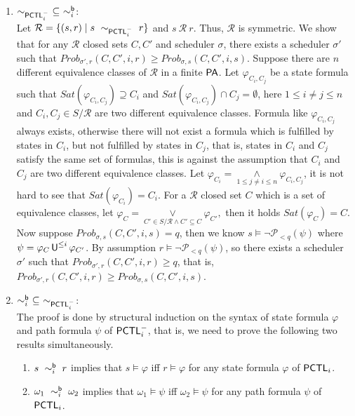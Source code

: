 \documentclass{LMCS}
\def\phi{\varphi}
\DeclareMathOperator{\U}{\text{\sf U}}
\newcommand{\PA}{{\sf PA}}
\newcommand{\PCTL}{{\sf PCTL}}
\newcommand{\iBSB}[1]{\sim_{#1}^{{\sf b}}}
\newcommand{\iEPCTLM}[1]{\sim_{\PCTL^{-}_{#1}}}
\newcommand{\MC}[1]{\mathcal{#1}}
\newcommand{\MEASURE}{\mathit{Prob}}
\begin{document}
\proof\hfill
\begin{enumerate}[(1)]
\item $\iEPCTLM{i}~\subseteq~\iBSB{i}$:\\
Let $\MC{R}=\{(s,r)\mid s~\iEPCTLM{i}~r\}$ and
  $s~\MC{R}~r$. Thus, $\MC{R}$ is symmetric. We show that for any
  $\MC{R}$ closed sets $C,C'$ and scheduler $\sigma$, there exists a
  scheduler $\sigma'$ such that
  $\MEASURE_{\sigma',r}(C,C',i,r)\geq\MEASURE_{\sigma,s}(C,C',i,s)$.
  Suppose there are $n$ different equivalence classes of $\MC{R}$ 
  in a finite $\PA$. Let
  $\phi_{C_i,C_j}$ be a state formula such that
  $\mathit{Sat}(\phi_{C_i,C_j})\supseteq C_i$ and
  $\mathit{Sat}(\phi_{C_i,C_j})\cap C_j=\emptyset$, here $1\leq i\neq
  j\leq n$ and $C_i,C_j\in S/\MC{R}$ are two different equivalence
  classes. Formula like $\phi_{C_i,C_j}$ always exists, otherwise
  there will not exist a formula which is fulfilled by states in
  $C_i$, but not fulfilled by states in $C_j$, that is, states in
  $C_i$ and $C_j$ satisfy the same set of formulas, this is against
  the assumption that $C_i$ and $C_j$ are two different equivalence
  classes. Let $\phi_{C_i}=\mathop{\land}\limits_{1\leq j\neq i\leq
    n}\phi_{C_i,C_j}$, it is not hard to see that
  $\mathit{Sat}(\phi_{C_i})=C_i$. For a $\MC{R}$ closed set $C$ which is
  a set of equivalence classes, let
  $\phi_C=\mathop{\vee}\limits_{C'\in S/\MC{R}\land
    C'\subseteq C}\phi_{C'},$ then it holds $\mathit{Sat}(\phi_C)=C$. Now
  suppose $\MEASURE_{\sigma,s}(C,C',i,s)=q$, then we
  know $s\models\neg\MC{P}_{<q}(\psi)$ where $\psi=\phi_{C}\U^{\leq
    i}\phi_{C'}$. By assumption $r\models\neg\MC{P}_{<q}(\psi)$, so there
  exists a scheduler $\sigma'$ such that
  $\MEASURE_{\sigma',r}(C,C',i,r)\geq q$, that is,
  $\MEASURE_{\sigma',r}(C,C',i,r)\geq\MEASURE_{\sigma,s}(C,C',i,s)$.
\item $\iBSB{i}~\subseteq~\iEPCTLM{i}$:\\
The proof is done by structural induction on the syntax of state formula $\phi$ and path formula $\psi$ of $\PCTL^{-}_i$, that is, we need to prove the following two results simultaneously.
\begin{enumerate}
\item $s~\iBSB{i}~r$ implies that $s\models\phi$ iff $r\models\phi$ for any state formula $\phi$ of $\PCTL_i$.
\item $\omega_1~\iBSB{i}~\omega_2$ implies that $\omega_1\models\psi$ iff $\omega_2\models\psi$ for any path formula $\psi$ of $\PCTL_i$.
\end{enumerate}

\end{enumerate}
\end{document}

